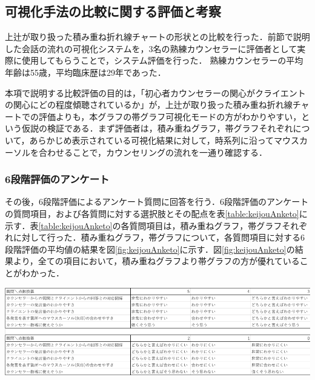 \documentclass[shuuron]{kuee}
\begin{document}







\subsection{可視化手法の比較に関する評価と考察}
上辻\cite{uetsuji}が取り扱った積み重ね折れ線チャートの形状との比較を行った．前節で説明した会話の流れの可視化システムを，3名の熟練カウンセラーに評価者として実際に使用してもらうことで，システム評価を行った．
熟練カウンセラーの平均年齢は55歳，平均臨床歴は29年であった．

本項で説明する比較評価の目的は，「初心者カウンセラーの関心がクライエントの関心にどの程度傾聴されているか」が，上辻\cite{uetsuji}が取り扱った積み重ね折れ線チャートでの評価よりも，本グラフの帯グラフ可視化モードの方がわかりやすい，という仮説の検証である．まず評価者は，積み重ねグラフ，帯グラフそれぞれについて，あらかじめ表示されている可視化結果に対して，時系列に沿ってマウスカーソルを合わせることで，カウンセリングの流れを一通り確認する．

\subsubsection{6段階評価のアンケート}


その後，6段階評価によるアンケート質問に回答を行う．6段階評価のアンケートの質問項目，および各質問に対する選択肢とその配点を表\ref{table:keijouAnketo}に示す．表\ref{table:keijouAnketo}の各質問項目は，積み重ねグラフ，帯グラフそれぞれに対して行った．積み重ねグラフ，帯グラフについて，各質問項目に対する6段階評価の平均値の結果を図\ref{fig:keijouAnketo}に示す．図\ref{fig:keijouAnketo}の結果より，全ての項目において，積み重ねグラフより帯グラフの方が優れていることがわかった．

\begin{table}
  \caption{可視化手法比較アンケートにおける6段階評価質問}
  \label{table:keijouAnketo}
  \begin{center}
    \includegraphics[width=\linewidth]{point.png}
\end{center}
\end{table}
\end{document}
